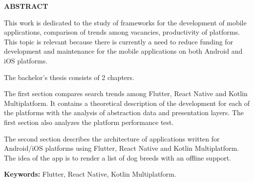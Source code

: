 \begin{center}
\textbf{ABSTRACT}
\end{center}

This work is dedicated to the study of frameworks for the development of mobile applications,
comparison of trends among vacancies, productivity of platforms.
This topic is relevant because there is currently a need to reduce funding for development and maintenance for the
mobile applications on both Android and iOS platforms.

The bachelor's thesis consists of 2 chapters.

The first section compares search trends among Flutter, React Native and Kotlin Multiplatform.
It contains a theoretical description of the development for each of the platforms with the analysis of abstraction data and presentation layers.
The first section also analyzes the platform performance test.

The second section describes the architecture of applications written for Android/iOS platforms using
Flutter, React Native and Kotlin Multiplatform. The idea of the app is to render a list of dog breeds with an
offline support.

{\bf Keywords:} Flutter, React Native, Kotlin Multiplatform.

